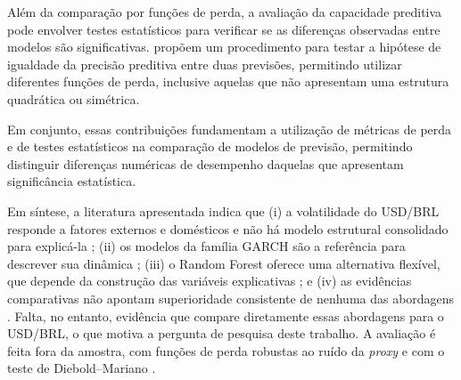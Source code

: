 Além da comparação por funções de perda, a avaliação da capacidade preditiva pode envolver testes estatísticos para verificar se as diferenças observadas entre modelos são significativas. \textcite{diebold1995comparing} propõem um procedimento para testar a hipótese de igualdade da precisão preditiva entre duas previsões, permitindo utilizar diferentes funções de perda, inclusive aquelas que não apresentam uma 
estrutura quadrática ou simétrica.

Em conjunto, essas contribuições fundamentam a utilização de métricas de perda e de testes estatísticos na comparação de modelos de previsão, permitindo distinguir diferenças numéricas de desempenho 
daquelas que apresentam significância estatística.

Em síntese, a literatura apresentada indica que (i) a volatilidade do USD/BRL responde a fatores externos e domésticos e não há modelo estrutural
consolidado para explicá-la \cite{bacen2021volatilidade,campani2018forecasting}; (ii) os modelos da família GARCH são a referência para descrever sua dinâmica
\cite{engle1982autoregressive,bollerslev1986generalized,nelson1991conditional}; (iii) o Random Forest oferece uma alternativa flexível, que depende da construção das variáveis explicativas
\cite{breiman2001random}; e (iv) as evidências comparativas não apontam superioridade consistente de nenhuma das abordagens \cite{hansen2005forecast,kilic2026linear}. Falta, no
entanto, evidência que compare diretamente essas abordagens para o USD/BRL, o que motiva a pergunta de pesquisa deste trabalho. A avaliação é feita fora da
amostra, com funções de perda robustas ao ruído da \textit{proxy} \cite{patton2011volatility} e com o teste de Diebold–Mariano \cite{diebold1995comparing}.



